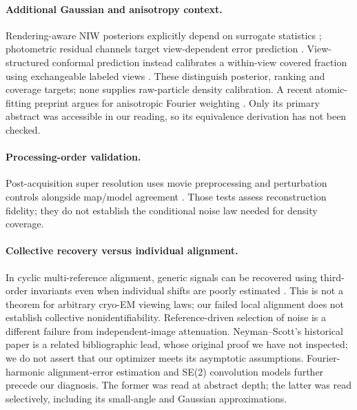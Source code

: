 \paragraph{Additional Gaussian and anisotropy context.}
Rendering-aware NIW posteriors explicitly depend on surrogate statistics
\citep{jia2026bayesiangs}; photometric residual channels target view-dependent
error prediction \citep{galappaththige2026ppu}. View-structured conformal
prediction instead calibrates a within-view covered fraction using
exchangeable labeled views \citep{chu2026viewcp}. These distinguish posterior,
ranking and coverage targets; none supplies raw-particle density calibration.
A recent atomic-fitting preprint argues for anisotropic Fourier weighting
\citep{yadgar2026anisotropy}. Only its primary abstract was accessible in our
reading, so its equivalence derivation has not been checked.

\paragraph{Processing-order validation.} Post-acquisition super resolution
uses movie preprocessing and perturbation controls alongside map/model
agreement \citep{pasr2026}. Those tests assess reconstruction fidelity;
they do not establish the conditional noise law needed for density coverage.

\paragraph{Collective recovery versus individual alignment.}
In cyclic multi-reference alignment, generic signals can be recovered using
third-order invariants even when individual shifts are poorly estimated
\citep{perry2019mra}. This is not a theorem for arbitrary cryo-EM viewing laws;
our failed local alignment does not establish collective nonidentifiability.
Reference-driven selection of noise \citep{henderson2013bias} is a different
failure from independent-image attenuation. Neyman--Scott's historical paper
\citep{neymanscott1948} is a related bibliographic lead, whose original proof
we have not inspected; we do not assert that our optimizer meets its
asymptotic assumptions. Fourier-harmonic alignment-error estimation
\citep{baldwin2005alignment} and SE(2) convolution models
\citep{park2011alignment} further precede our diagnosis. The former was read
at abstract depth; the latter was read selectively, including its small-angle
and Gaussian approximations.


